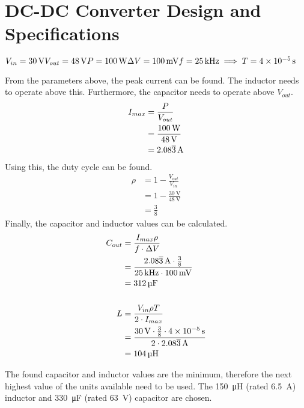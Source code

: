 \section{DC-DC Converter Design and Specifications}
\label{sec:specification}
$   %
    V_{in} = \qty{30}{\volt} \\
    V_{out} = \qty{48}{\volt} \\
    P = \qty{100}{\watt} \\
    \Delta V = \qty{100}{\milli\volt} \\
    f = \qty{25}{\kilo\hertz} \implies T = \qty{4d-5}{\second}
$

From the parameters above, the peak current can be found. The inductor needs to operate above this.
Furthermore, the capacitor needs to operate above $V_{out}$.
\begin{align*}  %
    I_{max} & = \frac{P}{V_{out}}                                    \\
            & = \frac{\qty{100}{\watt}}{\qty{48}{\volt}}             \\
            & = \qty[parse-numbers=false]{2.08\overline{3}}{\ampere}
\end{align*}
Using this, the duty cycle can be found.
\begin{align*}  %
    \rho & = 1 - \frac{V_{out}}{V_{in}}                  \\
         & = 1 - \frac{\qty{30}{\volt}}{\qty{48}{\volt}} \\
         & = \frac{3}{8}
\end{align*}
Finally, the capacitor and inductor values can be calculated.
\begin{align*}  %
    C_{out} & = \frac{I_{max}\rho}{f \cdot \Delta V}                                                                                                  \\
            & = \frac{ \qty[parse-numbers=false]{2.08\overline{3}}{\ampere} \cdot \frac{3}{8} }{ \qty{25}{\kilo\hertz} \cdot \qty{100}{\milli\volt} } \\
            & = \qty{312}{\micro\farad}
    \\ \\
    L       & = \frac{V_{in} \rho T}{2 \cdot I_{max}}                                                                                                 \\
            & = \frac{ \qty{30}{\volt} \cdot \frac{3}{8} \cdot \qty{4d-5}{\second} }{2 \cdot \qty[parse-numbers=false]{2.08\overline{3}}{\ampere} }   \\
            & = \qty{104}{\micro\henry}
\end{align*}

The found capacitor and inductor values are the minimum, therefore the next highest value
of the units available need to be used. The \qty{150}{\micro\henry} (rated \qty{6.5}{\ampere})
inductor and \qty{330}{\micro\farad} (rated \qty{63}{\volt}) capacitor are chosen.
